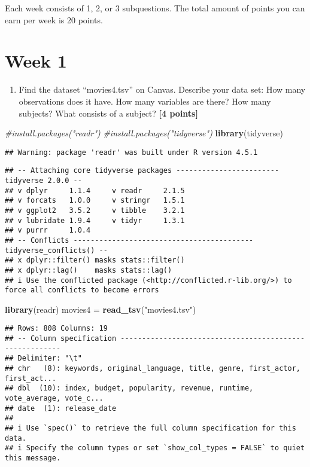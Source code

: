 \documentclass[
]{article}
\newenvironment{Shaded}{\begin{snugshade}}{\end{snugshade}}
\newcommand{\CommentTok}[1]{\textcolor[rgb]{0.56,0.35,0.01}{\textit{#1}}}
\newcommand{\FunctionTok}[1]{\textcolor[rgb]{0.13,0.29,0.53}{\textbf{#1}}}
\newcommand{\NormalTok}[1]{#1}
\newcommand{\OtherTok}[1]{\textcolor[rgb]{0.56,0.35,0.01}{#1}}
\newcommand{\StringTok}[1]{\textcolor[rgb]{0.31,0.60,0.02}{#1}}
\providecommand{\tightlist}{%
  \setlength{\itemsep}{0pt}\setlength{\parskip}{0pt}}
\begin{document}
Each week consists of 1, 2, or 3 subquestions. The total amount of
points you can earn per week is 20 points.

\section{Week 1}\label{week-1}

\begin{enumerate}
\def\labelenumi{\arabic{enumi}.}
\tightlist
\item
  Find the dataset ``movies4.tsv'' on Canvas. Describe your data set:
  How many observations does it have. How many variables are there? How
  many subjects? What consists of a subject? \textbf{[4 points]}
\end{enumerate}

\begin{Shaded}
\begin{Highlighting}[]
\CommentTok{\#install.packages("readr")}
\CommentTok{\#install.packages("tidyverse")}
\FunctionTok{library}\NormalTok{(tidyverse)}
\end{Highlighting}
\end{Shaded}

\begin{verbatim}
## Warning: package 'readr' was built under R version 4.5.1
\end{verbatim}

\begin{verbatim}
## -- Attaching core tidyverse packages ------------------------ tidyverse 2.0.0 --
## v dplyr     1.1.4     v readr     2.1.5
## v forcats   1.0.0     v stringr   1.5.1
## v ggplot2   3.5.2     v tibble    3.2.1
## v lubridate 1.9.4     v tidyr     1.3.1
## v purrr     1.0.4     
## -- Conflicts ------------------------------------------ tidyverse_conflicts() --
## x dplyr::filter() masks stats::filter()
## x dplyr::lag()    masks stats::lag()
## i Use the conflicted package (<http://conflicted.r-lib.org/>) to force all conflicts to become errors
\end{verbatim}

\begin{Shaded}
\begin{Highlighting}[]
\FunctionTok{library}\NormalTok{(readr)}
\NormalTok{movies4 }\OtherTok{=} \FunctionTok{read\_tsv}\NormalTok{(}\StringTok{"movies4.tsv"}\NormalTok{)}
\end{Highlighting}
\end{Shaded}

\begin{verbatim}
## Rows: 808 Columns: 19
## -- Column specification --------------------------------------------------------
## Delimiter: "\t"
## chr   (8): keywords, original_language, title, genre, first_actor, first_act...
## dbl  (10): index, budget, popularity, revenue, runtime, vote_average, vote_c...
## date  (1): release_date
## 
## i Use `spec()` to retrieve the full column specification for this data.
## i Specify the column types or set `show_col_types = FALSE` to quiet this message.
\end{verbatim}
\end{document}

